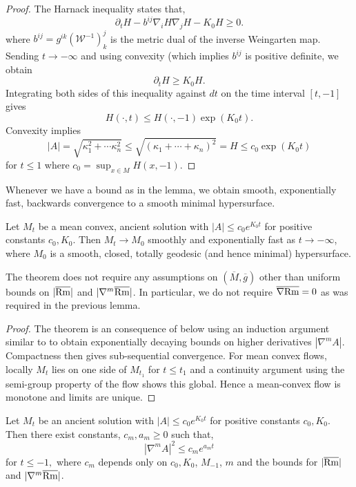 \documentclass{amsart}
\begin{document}
\begin{proof}
The Harnack inequality states that,
\[
\partial_t H - b^{ij}\nabla_iH\nabla_jH - K_0 H \geq 0.
\]
where \(b^{ij} = g^{ik} (\mathcal{W}^{-1})^j_k\) is the metric dual of the inverse Weingarten map. Sending \(t \to -\infty\) and using convexity (which implies \(b^{ij}\) is positive definite, we obtain
\[
\partial_t H \geq K_0 H.
\]
Integrating both sides of this inequality against $dt$ on the time interval $[t,-1]$ gives
\[
H(\cdot,t) \leq H(\cdot,-1) \exp(K_0t).
\]
Convexity implies
\[
|A| = \sqrt{\kappa_1^2 + \cdots \kappa_n^2} \leq \sqrt{(\kappa_1 + \cdots + \kappa_n)^2} = H \leq c_0\exp(K_0t)
\]
for $t\le 1$ where $c_0 = \sup_{x\in M} H(x, -1)$.
\end{proof}

Whenever we have a bound as in the lemma, we obtain smooth, exponentially fast, backwards convergence to a smooth minimal hypersurface.

\begin{thm}
\label{thm:backwards_convergence}
Let \(M_t\) be a mean convex, ancient solution with \(|A| \leq c_0 e^{K_0t}\) for positive constants \(c_0, K_0\). Then \(M_t \to M_0\) smoothly and exponentially fast as \(t \to -\infty\), where \(M_0\) is a smooth, closed, totally geodesic (and hence minimal) hypersurface.
\end{thm}

\begin{rem}
The theorem does not require any assumptions on \((\overline{M}, \overline{g})\) other than uniform bounds on \(|\overline{\operatorname{Rm}}|\) and \(|\nabla^m \overline{\operatorname{Rm}}|\). In particular, we do not require \(\overline{\nabla} \overline{\operatorname{Rm}} = 0\) as was required in the previous lemma.
\end{rem}

\begin{proof}
The theorem is an consequence of  below using an induction argument similar to \cite[Section 13]{Hamilton:/1982} to obtain exponentially decaying bounds on higher derivatives \(|\nabla^m A|\). Compactness then gives sub-sequential convergence. For mean convex flows, locally \(M_t\) lies on one side of \(M_{t_1}\) for \(t \leq t_1\) and a continuity argument using the semi-group property of the flow shows this global. Hence a mean-convex flow is monotone and limits are unique.
\end{proof}

\begin{lemma}
\label{lem:higher_derivative_bounds}
Let \(M_t\) be an ancient solution with \(|A| \leq c_0 e^{K_0t}\) for positive constants \(c_0, K_0\). Then there exist constants, \(c_m, a_m \geq 0\) such that,
\begin{equation}
\label{eq:higher_derivative_bounds}
|\nabla^mA|^2 \leq c_m e^{a_m t}
\end{equation}
for $t\le -1,$ where $c_m$ depends only on $c_0,K_0$, $M_{-1}$, $m$ and the bounds for \(|\overline{\operatorname{Rm}}|\) and \(|\nabla^m \overline{\operatorname{Rm}}|\). 
\end{lemma}
\end{document}
